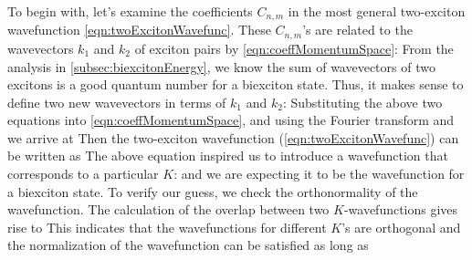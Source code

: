 To begin with, let's examine the coefficients $C_{n,m}$ in the most general two-exciton wavefunction
 \autoref{eqn:twoExcitonWavefunc}. These $C_{n,m}$'s are related to the wavevectors $k_1$ and $k_2$ of exciton
 pairs by \autoref{eqn:coeffMomentumSpace}:
 From the analysis in
 \autoref{subsec:biexcitonEnergy}, we know the sum of wavevectors of two excitons is a good quantum number
for a biexciton state. Thus, it makes sense to define two new wavevectors in terms of $k_1$ and $k_2$:
Substituting the above two equations into \autoref{eqn:coeffMomentumSpace}, and using the Fourier transform
and 
we arrive at
Then the two-exciton wavefunction (\autoref{eqn:twoExcitonWavefunc}) can be written as
The above equation inspired us to introduce a wavefunction that corresponds to a particular $K$:
and we are expecting it to be the wavefunction for a biexciton state. To verify our guess, we check the orthonormality
 of  the wavefunction. The calculation of the overlap between two $K$-wavefunctions gives rise to
This indicates that the wavefunctions for different $K$'s are orthogonal and the normalization of the wavefunction
 can be satisfied as long as


